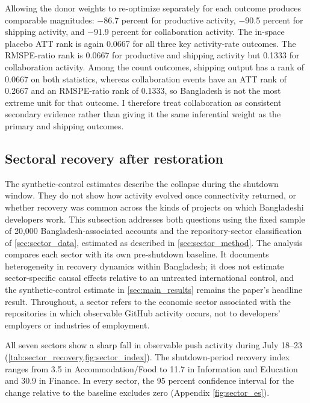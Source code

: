 Allowing the donor weights to re-optimize separately for each outcome produces comparable magnitudes: $-$86.7 percent for productive activity, $-$90.5 percent for shipping activity, and $-$91.9 percent for collaboration activity. The in-space placebo ATT rank is again 0.0667 for all three key activity-rate outcomes. The RMSPE-ratio rank is 0.0667 for productive and shipping activity but 0.1333 for collaboration activity. Among the count outcomes, shipping output has a rank of 0.0667 on both statistics, whereas collaboration events have an ATT rank of 0.2667 and an RMSPE-ratio rank of 0.1333, so Bangladesh is not the most extreme unit for that outcome. I therefore treat collaboration as consistent secondary evidence rather than giving it the same inferential weight as the primary and shipping outcomes.



\subsection{Sectoral recovery after restoration}
\label{sec:sector_results}

The synthetic-control estimates describe the collapse during the shutdown window. They do not show how activity evolved once connectivity returned, or whether recovery was common across the kinds of projects on which Bangladeshi developers work. This subsection addresses both questions using the fixed sample of 20,000 Bangladesh-associated accounts and the repository-sector classification of \cref{sec:sector_data}, estimated as described in \cref{sec:sector_method}. The analysis compares each sector with its own pre-shutdown baseline. It documents heterogeneity in recovery dynamics within Bangladesh; it does not estimate sector-specific causal effects relative to an untreated international control, and the synthetic-control estimate in \cref{sec:main_results} remains the paper's headline result. Throughout, a sector refers to the economic sector associated with the repositories in which observable GitHub activity occurs, not to developers' employers or industries of employment.



All seven sectors show a sharp fall in observable push activity during July 18--23 (\cref{tab:sector_recovery,fig:sector_index}). The shutdown-period recovery index ranges from 3.5 in Accommodation/Food to 11.7 in Information and Education and 30.9 in Finance. In every sector, the 95 percent confidence interval for the change relative to the baseline excludes zero (Appendix \cref{fig:sector_es}).

